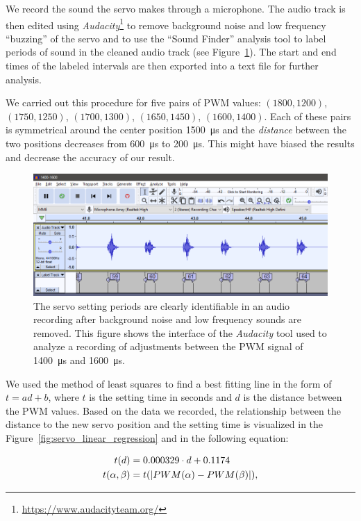 We record the sound the servo makes through a microphone. The audio track is then edited using \textit{Audacity}\footnote{\url{https://www.audacityteam.org/}} to remove background noise and low frequency ``buzzing'' of the servo and to use the ``Sound Finder'' analysis tool to label periods of sound in the cleaned audio track (see Figure~\ref{fig:audacity}). The start and end times of the labeled intervals are then exported into a text file for further analysis.

We carried out this procedure for five pairs of \gls*{PWM} values: $(1800, 1200)$, $(1750, 1250)$, $(1700, 1300)$, $(1650, 1450)$, $(1600, 1400)$. Each of these pairs is symmetrical around the center position \SI{1500}{\micro\second} and the \textit{distance} between the two positions decreases from \SI{600}{\micro\second} to \SI{200}{\micro\second}. This might have biased the results and decrease the accuracy of our result.

\begin{figure}[b]
	\includegraphics[width=\textwidth]{../img/servo_experiment_audacity}
	\protect\caption{The servo setting periods are clearly identifiable in an audio recording after background noise and low frequency sounds are removed. This figure shows the interface of the \textit{Audacity} tool used to analyze a recording of adjustments between the PWM signal of \SI{1400}{\micro\second} and \SI{1600}{\micro\second}.}
	\label{fig:audacity}
\end{figure}

We used the method of least squares to find a best fitting line in the form of $t=ad+b$, where $t$ is the setting time in seconds and $d$ is the distance between the \gls*{PWM} values. Based on the data we recorded, the relationship between the distance to the new servo position and the setting time is visualized in the Figure~\ref{fig:servo_linear_regression} and in the following equation:

\begin{equation}[h!]
\label{eq:servo_setting_time}
\begin{aligned}
t(d)&=0.000329\cdot d + 0.1174\\
t(\alpha,\beta)&=t(\abs{PWM(\alpha)-PWM(\beta)}),
\end{aligned}
\end{equation}

